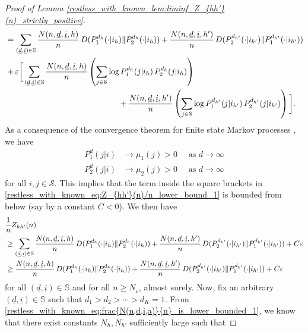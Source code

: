 \begin{proof}[Proof of Lemma \ref{restless_with_known_lem:liminf_Z_{hh'}(n)_strictly_positive}]
\begin{align}
	&=\sum\limits_{(\underline{d},\underline{i})\in\mathbb{S}}\frac{N(n,\underline{d},\underline{i},h)}{n}\,D(P_1^{d_h}(\cdot|i_h)\|P_2^{d_h}(\cdot|i_h))+\frac{N(n,\underline{d},\underline{i},h')}{n}\,D(P_2^{d_{h'}}(\cdot|i_{h'})\|P_1^{d_{h'}}(\cdot|i_{h'}))\nonumber\\
	&+\varepsilon\bigg[\sum\limits_{(\underline{d},\underline{i})\in\mathbb{S}}\frac{N(n,\underline{d},\underline{i},h)}{n}\left(\sum\limits_{j\in \mathcal{S}} \log P_1^{d_h}(j|i_h)\,P_2^{d_h}(j|i_h)\right)\nonumber\\
	&\hspace{5cm}+\frac{N(n,\underline{d},\underline{i},h')}{n}\left(\sum\limits_{j\in \mathcal{S}} \log P_1^{d_{h'}}(j|i_{h'})\,P_2^{d_{h'}}(j|i_{h'})\right)\bigg].\label{restless_with_known_eq:Z_{hh'}(n)/n_lower_bound_1}
\end{align}
As a consequence of the convergence theorem for finite state Markov processes \cite[Theorem 4.9]{levin2017markov}, we have 
\begin{align}
	P_1^{d}(j|i)&\longrightarrow \mu_1(j)>0\quad \text{ as }d\to\infty\nonumber\\
	P_2^{d}(j|i)&\longrightarrow \mu_2(j)>0\quad \text{ as }d\to\infty\label{restless_with_known_eq:convergence_theorem_convergences}
\end{align}
for all $i,j\in\mathcal{S}$. This implies that
 the term inside the square brackets in \eqref{restless_with_known_eq:Z_{hh'}(n)/n_lower_bound_1} is bounded from below (say by a constant $C<0$). We then have
 \begin{align}
 	&\frac{1}{n}Z_{hh'}(n)\nonumber\\
	&\geq \sum\limits_{(\underline{d},\underline{i})\in\mathbb{S}}\frac{N(n,\underline{d},\underline{i},h)}{n}\,D(P_1^{d_h}(\cdot|i_h)\|P_2^{d_h}(\cdot|i_h))+\frac{N(n,\underline{d},\underline{i},h')}{n}\,D(P_2^{d_{h'}}(\cdot|i_{h'})\|P_1^{d_{h'}}(\cdot|i_{h'})) + C\varepsilon\nonumber\\
 	&\geq \frac{N(n,\underline{d},\underline{i},h)}{n}\,D(P_1^{d_h}(\cdot|i_h)\|P_2^{d_h}(\cdot|i_h))+\frac{N(n,\underline{d},\underline{i},h')}{n}\,D(P_2^{d_{h'}}(\cdot|i_{h'})\|P_1^{d_{h'}}(\cdot|i_{h'})) + C\varepsilon\label{restless_with_known_eq:Z_{hh'}(n)/n_lower_bound_2}
 \end{align} 
for all $(\underline{d},\underline{i})\in\mathbb{S}$ and
for all $n\geq N_\varepsilon$, almost surely. Now, fix an arbitrary $(\underline{d},\underline{i})\in\mathbb{S}$ such that $d_1>d_2>\cdots>d_K=1$. From \eqref{restless_with_known_eq:frac{N(n,d,i,a)}{n}_is_lower_bounded_1}, we know that there exist constants $N_h, N_{h'}$ sufficiently large such that

\end{proof}
